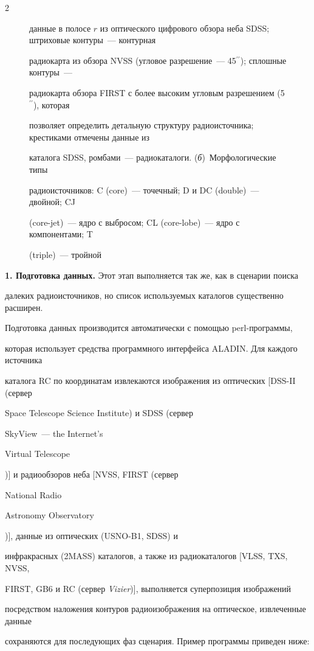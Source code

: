 \begin{multicols}{2}
\begin{figure}[b]
{данные в полосе $r$ из оптического цифрового обзора неба SDSS; штриховые контуры~--- контурная 

радиокарта из обзора NVSS (угловое разрешение~--- 45$^{\prime\prime}$); сплошные контуры~--- 

радиокарта обзора FIRST с более высоким угловым разрешением (5$^{\prime\prime}$), которая 

позволяет определить детальную структуру радиоисточника; крестиками отмечены данные из 

каталога SDSS, ромбами~--- радиокаталоги. (\textit{б})~Морфологические типы 

радиоисточников: C ({core})~--- точечный; D и DC ({double})~--- двойной; CJ 

({core-jet})~--- ядро с выбросом; CL ({core-lobe})~--- ядро с компонентами; T 

(triple)~--- тройной}

\end{figure}

      

\textbf{1. Подготовка данных.} Этот этап выполняется так же, как в сценарии поиска 

далеких радиоисточников, но список используемых каталогов существенно расширен. 

Подготовка данных производится автоматически с помощью {perl}-программы, 

которая использует средства программного интерфейса ALADIN. Для каждого источника 

каталога RC по координатам извлекаются изображения из оптических [DSS-II (сервер 

{Space Telescope Science Institute}) и SDSS (сервер {SkyView~--- the Internet's 

Virtual Telescope})] и радиообзоров неба [NVSS, FIRST (сервер {National Radio 

Astronomy Observatory})], данные из оптических (USNO-B1, SDSS) и 

инфракрасных (2MASS) каталогов, а также из радиокаталогов [VLSS, TXS, NVSS, 

FIRST, GB6 и RC (сервер \textit{Vizier})], выполняется суперпозиция изображений 

посредством наложения контуров радиоизображения на оптическое, извлеченные данные 

сохраняются для последующих фаз сценария. Пример программы приведен ниже:







\end{multicols}
